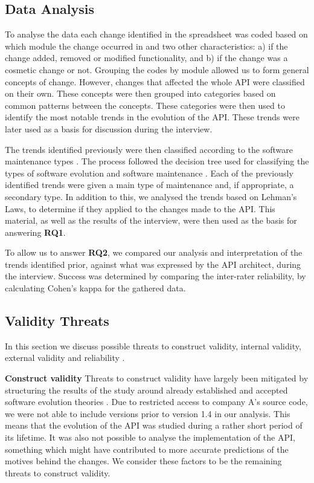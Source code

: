 \documentclass{sig-alternate}
\begin{document}
\subsection{Data Analysis} \label{data_analysis}

To analyse the data each change identified in the spreadsheet was coded based on which module the change occurred in and two other characteristics: a) if the change added, removed or modified functionality, and b) if the change was a cosmetic change or not.
Grouping the codes by module allowed us to form general concepts of change. However, changes that affected the whole API were classified on their own. %
These concepts were then grouped into categories based on common patterns between the concepts.
These categories were then used to identify the most notable trends in the evolution of the API. These trends were later used as a basis for discussion during the interview.

The trends identified previously were then classified according to the software maintenance types \cite{chapin2001types}. The process followed the decision tree used for classifying the types of software evolution and software maintenance \cite{chapin2001types}. Each of the previously identified trends were given a main type of maintenance and, if appropriate, a secondary type. In addition to this, we analysed the trends based on Lehman's Laws, to determine if they applied to the changes made to the API. This material, as well as the results of the interview, were then used as the basis for answering \textbf{RQ1}.

To allow us to answer \textbf{RQ2}, we compared our analysis and interpretation of the trends identified prior, against what was expressed by the API architect, during the interview. Success was determined by comparing the inter-rater reliability, by calculating Cohen's kappa \cite{cohen1968weighted} for the gathered data. 





\subsection{Validity Threats} \label{validity_threats} 
In this section we discuss possible threats to construct validity, internal validity, external validity and reliability \cite{runeson2009guidelines}.

\smallskip \noindent
\textbf{Construct validity  } Threats to construct validity have largely been mitigated by structuring the results of the study around already established and accepted software evolution theories \cite{chapin2001types, lehman90sview}. Due to restricted access to company A's source code, we were not able to include versions prior to version 1.4 in our analysis. This means that the evolution of the API was studied during a rather short period of its lifetime. It was also not possible to analyse the implementation of the API, something which might have contributed to more accurate predictions of the motives behind the changes. We consider these factors to be the remaining threats to construct validity. 
\end{document}

